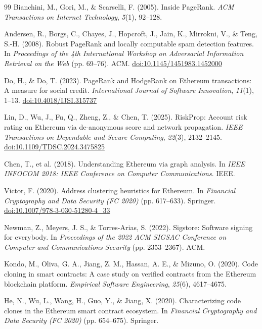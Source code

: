 \begin{thebibliography}{99}
 Bianchini, M., Gori, M., \& Scarselli, F. (2005). Inside PageRank. \textit{ACM Transactions on Internet Technology}, \textit{5}(1), 92--128.

 Andersen, R., Borgs, C., Chayes, J., Hopcroft, J., Jain, K., Mirrokni, V., \& Teng, S.-H. (2008). Robust PageRank and locally computable spam detection features. In \textit{Proceedings of the 4th International Workshop on Adversarial Information Retrieval on the Web} (pp. 69--76). ACM. \href{https://doi.org/10.1145/1451983.1452000}{doi:10.1145/1451983.1452000}

 Do, H., \& Do, T. (2023). PageRank and HodgeRank on Ethereum transactions: A measure for social credit. \textit{International Journal of Software Innovation}, \textit{11}(1), 1--13. \href{https://doi.org/10.4018/IJSI.315737}{doi:10.4018/IJSI.315737}

 Lin, D., Wu, J., Fu, Q., Zheng, Z., \& Chen, T. (2025). RiskProp: Account risk rating on Ethereum via de-anonymous score and network propagation. \textit{IEEE Transactions on Dependable and Secure Computing}, \textit{22}(3), 2132--2145. \href{https://doi.org/10.1109/TDSC.2024.3475825}{doi:10.1109/TDSC.2024.3475825}

 Chen, T., et al. (2018). Understanding Ethereum via graph analysis. In \textit{IEEE INFOCOM 2018: IEEE Conference on Computer Communications}. IEEE.

 Victor, F. (2020). Address clustering heuristics for Ethereum. In \textit{Financial Cryptography and Data Security (FC 2020)} (pp. 617--633). Springer. \href{https://doi.org/10.1007/978-3-030-51280-4_33}{doi:10.1007/978-3-030-51280-4\_33}

 Newman, Z., Meyers, J. S., \& Torres-Arias, S. (2022). Sigstore: Software signing for everybody. In \textit{Proceedings of the 2022 ACM SIGSAC Conference on Computer and Communications Security} (pp. 2353--2367). ACM.

 Kondo, M., Oliva, G. A., Jiang, Z. M., Hassan, A. E., \& Mizuno, O. (2020). Code cloning in smart contracts: A case study on verified contracts from the Ethereum blockchain platform. \textit{Empirical Software Engineering}, \textit{25}(6), 4617--4675.

 He, N., Wu, L., Wang, H., Guo, Y., \& Jiang, X. (2020). Characterizing code clones in the Ethereum smart contract ecosystem. In \textit{Financial Cryptography and Data Security (FC 2020)} (pp. 654--675). Springer.


\end{thebibliography}
